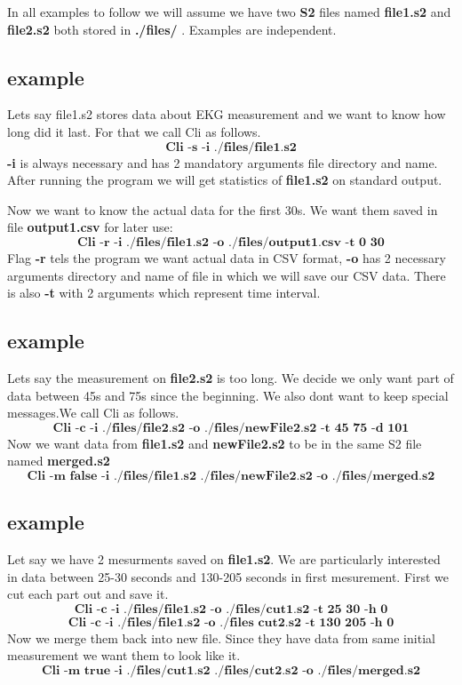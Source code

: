 \documentclass[english]{article}
\begin{document}
In all examples to follow we will assume we have two \textbf{S2} files named \textbf{file1.s2} and \textbf{file2.s2} both stored in \textbf{./files/} . Examples are independent.


\subsection{example}
Lets say file1.s2 stores data about EKG measurement and we want to know how long did it last. For that we call Cli as follows. $$\textbf{Cli -s -i ./files/file1.s2} $$
 \textbf{-i} is always necessary and has 2 mandatory arguments file directory and name. After running the program we will get statistics of \textbf{file1.s2} on standard output.

Now we want to know the actual data for the first 30s. We want them saved in file \textbf{output1.csv} for later use: $$ \textbf{Cli -r -i ./files/file1.s2 -o ./files/output1.csv -t 0 30} $$
Flag \textbf{-r} tels the program we want actual data in CSV format, \textbf{-o} has 2 necessary arguments directory and name of file in which we will save our CSV data. There is also \textbf{-t} with 2 arguments which represent time interval.


\subsection{example}
Lets say the measurement on \textbf{file2.s2} is too long. We decide we only want part of data between 45s and 75s since the beginning. We also dont want to keep special messages.We call Cli as follows.
$$ \textbf{Cli -c -i ./files/file2.s2 -o ./files/newFile2.s2 -t 45 75 -d 101}$$
Now we want data from \textbf{file1.s2} and \textbf{newFile2.s2} to be in the same S2 file named \textbf{merged.s2}
$$ \textbf{Cli -m false -i ./files/file1.s2 ./files/newFile2.s2 -o ./files/merged.s2}$$


\subsection{example}
Let say we have 2 mesurments saved on \textbf{file1.s2}. We are particularly interested in data between 25-30 seconds and 130-205 seconds in first mesurement. First we cut each part out and save it. 
$$ \textbf{Cli -c -i ./files/file1.s2 -o ./files/cut1.s2 -t 25 30 -h 0}    $$
$$ \textbf{Cli -c -i ./files/file1.s2 -o ./files cut2.s2 -t 130 205 -h 0}$$
Now we merge them back into new file. Since they have data from same initial measurement we want them to look like it.
$$ \textbf{Cli -m true -i ./files/cut1.s2 ./files/cut2.s2 -o ./files/merged.s2}$$
\end{document}
